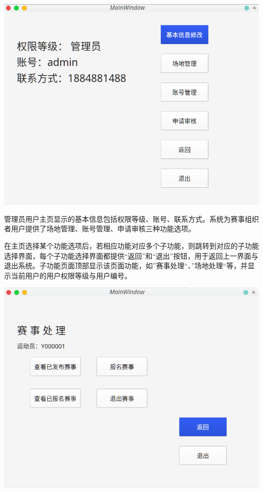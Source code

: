 \documentclass[a4paper,UTF8]{article}
\begin{document}
{\centering\includegraphics[width=1\columnwidth]{7.png}
	
}

管理员用户主页显示的基本信息包括权限等级、账号、联系方式。系统为赛事组织者用户提供了场地管理、账号管理、申请审核三种功能选项。

在主页选择某个功能选项后，若相应功能对应多个子功能，则跳转到对应的子功能选择界面，每个子功能选择界面都提供“返回”和“退出”按钮，用于返回上一界面与退出系统。子功能页面顶部显示该页面功能，如”赛事处理“、”场地处理“等，并显示当前用户的用户权限等级与用户编号。

{\centering\includegraphics[width=1\columnwidth]{9.png}
	
}
\end{document}
